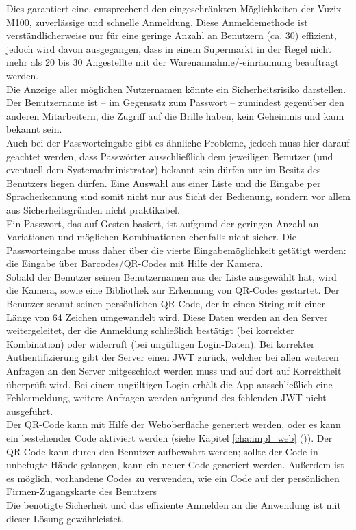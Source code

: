 Dies garantiert eine, entsprechend den eingeschränkten Möglichkeiten der Vuzix M100, zuverlässige und schnelle Anmeldung. Diese Anmeldemethode ist verständlicherweise nur für eine geringe Anzahl an Benutzern (ca. 30) effizient, jedoch wird davon ausgegangen, dass in einem Supermarkt in der Regel nicht mehr als 20 bis 30 Angestellte mit der Warenannahme/-einräumung beauftragt werden.\\
Die Anzeige aller möglichen Nutzernamen könnte ein Sicherheitsrisiko darstellen. Der Benutzername ist -- im Gegensatz zum Passwort -- zumindest gegenüber den anderen Mitarbeitern, die Zugriff auf die Brille haben, kein Geheimnis und kann bekannt sein.\\

Auch bei der Passworteingabe gibt es ähnliche Probleme, jedoch muss hier darauf geachtet werden, dass Passwörter ausschließlich dem jeweiligen Benutzer (und eventuell dem Systemadministrator) bekannt sein dürfen \bzw nur im Besitz des Benutzers liegen dürfen. Eine Auswahl aus einer Liste und die Eingabe per Spracherkennung sind somit nicht nur aus Sicht der Bedienung, sondern vor allem aus Sicherheitsgründen nicht praktikabel.\\
Ein Passwort, das auf Gesten basiert, ist aufgrund der geringen Anzahl an Variationen und möglichen Kombinationen ebenfalls nicht sicher. Die Passworteingabe muss daher über die vierte Eingabemöglichkeit getätigt werden: die Eingabe über Barcodes/QR-Codes mit Hilfe der Kamera.\\

Sobald der Benutzer seinen Benutzernamen aus der Liste ausgewählt hat, wird die Kamera, sowie eine Bibliothek zur Erkennung von QR-Codes gestartet. Der Benutzer scannt seinen persönlichen QR-Code, der in einen String mit einer Länge von 64 Zeichen umgewandelt wird. Diese Daten werden an den Server weitergeleitet, der die Anmeldung schließlich bestätigt (bei korrekter Kombination) oder widerruft (bei ungültigen Login-Daten). Bei korrekter Authentifizierung gibt der Server einen \acl{JWT} zurück, welcher bei allen weiteren Anfragen an den Server mitgeschickt werden muss und auf dort auf Korrektheit überprüft wird. Bei einem ungültigen Login erhält die App ausschließlich eine Fehlermeldung, weitere Anfragen werden aufgrund des fehlenden \acs{JWT} nicht ausgeführt.\\

Der QR-Code kann mit Hilfe der Weboberfläche generiert werden, oder es kann ein bestehender Code aktiviert werden (siehe Kapitel \ref{cha:impl_web} ()). Der QR-Code kann durch den Benutzer aufbewahrt werden; sollte der Code in unbefugte Hände gelangen, kann ein neuer Code generiert werden. Außerdem ist es möglich, vorhandene Codes zu verwenden, wie \zB ein Code auf der persönlichen Firmen-Zugangskarte des Benutzers\\
Die benötigte Sicherheit und das effiziente Anmelden an die Anwendung ist mit dieser Lösung gewährleistet.

